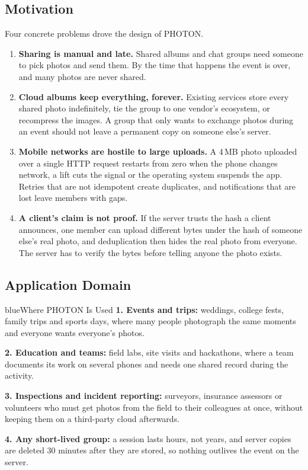 \subsection{Motivation}

Four concrete problems drove the design of PHOTON.

\begin{enumerate}
  \item \textbf{Sharing is manual and late.} Shared albums and chat groups need someone to pick photos and send them. By the time that happens the event is over, and many photos are never shared.
  \item \textbf{Cloud albums keep everything, forever.} Existing services store every shared photo indefinitely, tie the group to one vendor's ecosystem, or recompress the images. A group that only wants to exchange photos during an event should not leave a permanent copy on someone else's server.
  \item \textbf{Mobile networks are hostile to large uploads.} A 4\,MB photo uploaded over a single HTTP request restarts from zero when the phone changes network, a lift cuts the signal or the operating system suspends the app. Retries that are not idempotent create duplicates, and notifications that are lost leave members with gaps.
  \item \textbf{A client's claim is not proof.} If the server trusts the hash a client announces, one member can upload different bytes under the hash of someone else's real photo, and deduplication then hides the real photo from everyone. The server has to verify the bytes before telling anyone the photo exists.
\end{enumerate}

\subsection{Application Domain}

\begin{pbox}{blue}{Where PHOTON Is Used}
\textbf{1. Events and trips:} weddings, college fests, family trips and sports days, where many people photograph the same moments and everyone wants everyone's photos.\par\smallskip
\textbf{2. Education and teams:} field labs, site visits and hackathons, where a team documents its work on several phones and needs one shared record during the activity.\par\smallskip
\textbf{3. Inspections and incident reporting:} surveyors, insurance assessors or volunteers who must get photos from the field to their colleagues at once, without keeping them on a third-party cloud afterwards.\par\smallskip
\textbf{4. Any short-lived group:} a session lasts hours, not years, and server copies are deleted 30 minutes after they are stored, so nothing outlives the event on the server.
\end{pbox}

